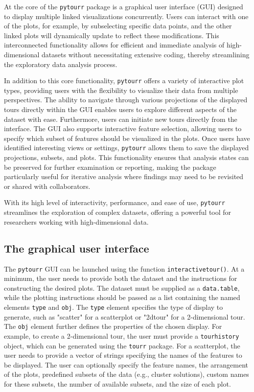 \documentclass[article]{ajs}
\begin{document}
At the core of the \texttt{pytourr} package is a graphical user interface (GUI) designed to display multiple linked visualizations concurrently. Users can interact with one of the plots, for example, by subselecting specific data points, and the other linked plots will dynamically update to reflect these modifications. This interconnected functionality allows for efficient and immediate analysis of high-dimensional datasets without necessitating extensive coding, thereby streamlining the exploratory data analysis process.

In addition to this core functionality, \texttt{pytourr} offers a variety of interactive plot types, providing users with the flexibility to visualize their data from multiple perspectives. The ability to navigate through various projections of the displayed tours directly within the GUI enables users to explore different aspects of the dataset with ease. Furthermore, users can initiate new tours directly from the interface. The GUI also supports interactive feature selection, allowing users to specify which subset of features should be visualized in the plots. Once users have identified interesting views or settings, \texttt{pytourr} allows them to save the displayed projections, subsets, and plots. This functionality ensures that analysis states can be preserved for further examination or reporting, making the package particularly useful for iterative analysis where findings may need to be revisited or shared with collaborators.

With its high level of interactivity, performance, and ease of use, \texttt{pytourr} streamlines the exploration of complex datasets, offering a powerful tool for researchers working with high-dimensional data.


\subsection{The graphical user interface}

The \texttt{pytourr} GUI can be launched using the function \texttt{interactive\textunderscore tour()}. At a minimum, the user needs to provide both the dataset and the instructions for constructing the desired plots. The dataset must be supplied as a \texttt{data.table}, while the plotting instructions should be passed as a list containing the named elements \texttt{type} and \texttt{obj}. The \texttt{type} element specifies the type of display to generate, such as "scatter" for a scatterplot or "2d\textunderscore tour" for a 2-dimensional tour. The \texttt{obj} element further defines the properties of the chosen display. For example, to create a 2-dimensional tour, the user must provide a \texttt{tour\textunderscore history} object, which can be generated using the \texttt{tourr} package. For a scatterplot, the user needs to provide a vector of strings specifying the names of the features to be displayed. The user can optionally specify the feature names, the arrangement of the plots, predefined subsets of the data (e.g., cluster solutions), custom names for these subsets, the number of available subsets, and the size of each plot.
\end{document}

